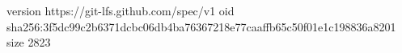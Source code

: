 version https://git-lfs.github.com/spec/v1
oid sha256:3f5dc99c2b6371dcbc06db4ba76367218e77caaffb65c50f01e1c198836a8201
size 2823
